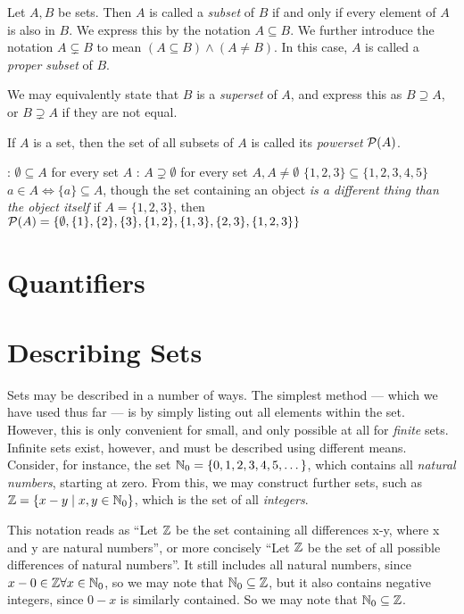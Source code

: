 Let \(A, B\) be sets. Then \(A\) is called a \emph{subset} of \(B\) if and only if
every element of \(A\) is also in \(B\). We express this by the notation
\(A \subseteq B\). We further introduce the notation \(A \subsetneq B\) to mean
\((A \subseteq B) \land (A \neq B)\). In this case, \(A\) is called a \emph{proper
  subset} of \(B\).

We may equivalently state that \(B\) is a \emph{superset} of \(A\), and express
this as \(B \supseteq A\), or \(B \supsetneq A\) if they are not equal.

If \(A\) is a set, then the set of all subsets of \(A\) is called its
\emph{powerset} \(\mathcal{P}(A)\).

\begin{example}
  \begin{itemize}
    \leavevmode
    :
          \(\emptyset \subseteq A\) for every set \(A\)
    :
          \(A \supsetneq \emptyset\) for every set \(A, A \neq \emptyset\)
    \ii{} \(\{1,2,3\} \subseteq \{1,2,3,4,5\}\)
    \ii{} \(a \in A \Leftrightarrow \{a\} \subseteq A\), though the set containing an object \emph{is a
          different thing than the object itself}
    \ii{} if \(A = \{1,2,3\}\), then
          \(\mathcal{P}(A) = \{\emptyset, \{1\}, \{2\}, \{3\}, \{1,2\}, \{1,3\}, \{2,3\}, \{1,2,3\}\}\)
  \end{itemize}
\end{example}

\section{Quantifiers}

\section{Describing Sets}
Sets may be described in a number of ways.
The simplest method --- which we have used thus far --- is by simply listing out
all elements within the set.
However, this is only convenient for small, and only possible at all for
\emph{finite} sets.
Infinite sets exist, however, and must be described using different means.
Consider, for instance, the set \(\mathbb{N}_{0} = \{0,1,2,3,4,5,\dots\}\),
which contains all \emph{natural numbers}, starting at zero.
From this, we may construct further sets, such as
\(\mathbb{Z} = \{x-y \mid x, y \in \mathbb{N}_0\}\), which is the set of all
\emph{integers}.
\begin{remark}
  This notation reads as ``Let \(\mathbb{Z}\) be the set containing all differences
  x-y, where x and y are natural numbers'', or more concisely ``Let \(\mathbb{Z}\)
  be the set of all possible differences of natural numbers''. It still includes
  all natural numbers, since \(x - 0 \in \mathbb{Z} \forall x \in \mathbb{N}_0\), so we may
  note that \(\mathbb{N}_0 \subseteq \mathbb{Z}\), but it also contains negative integers, since \(0 - x\)
  is similarly contained.
  So we may note that \(\mathbb{N}_0 \subseteq \mathbb{Z}\).
\end{remark}

